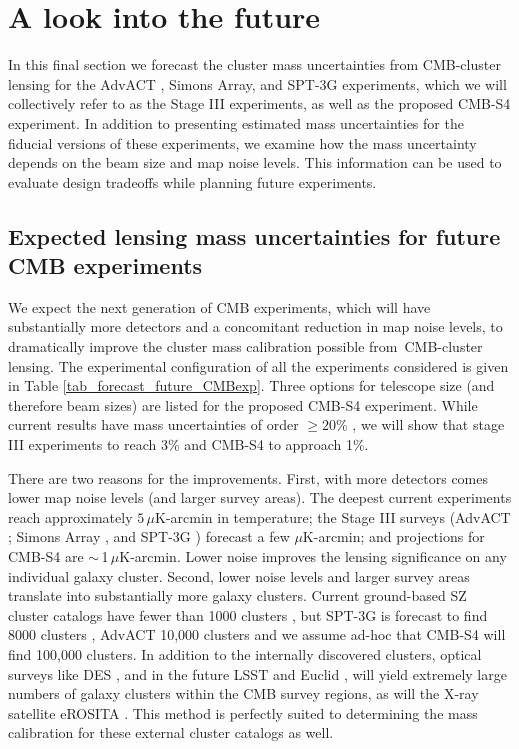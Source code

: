 \section{A look into the future}
\label{sec_forecast}
In this final section we forecast the cluster mass uncertainties from CMB-cluster lensing for the AdvACT , Simons Array, and SPT-3G experiments, which we will collectively refer to as the Stage III experiments, as well as the proposed CMB-S4 experiment.
In addition to presenting estimated mass uncertainties for the fiducial versions of these experiments, we examine how the mass uncertainty depends on  the beam size and map noise levels.
This information can be used to evaluate design tradeoffs while planning future experiments.

\subsection{Expected lensing mass uncertainties for future CMB experiments}
\label{sec_cmbs4}

We expect the next generation of CMB experiments, which will have substantially more detectors and a concomitant reduction in map noise levels, to dramatically improve the cluster mass calibration possible from\
 CMB-cluster lensing.
The experimental configuration of all the experiments considered is given in Table \ref{tab_forecast_future_CMBexp}.
Three options for telescope size (and therefore beam sizes) are listed for the proposed CMB-S4 experiment.
While current results have mass uncertainties of order $\ge 20$\% \citep{baxter15,madhavacheril15,placksz15}, we will show that stage III experiments to reach 3\% and CMB-S4 to approach 1\%.

There are two reasons for the improvements.
First, with more detectors comes lower map noise levels (and larger survey areas).
The deepest current experiments reach approximately $5\,\mu$K-arcmin in temperature; the Stage III surveys  (AdvACT \citep{henderson16};  Simons Array \citep{suzuki15}, and SPT-3G \citep{benson14}) forecast a few $\mu$K-arcmin; and projections for CMB-S4 are $\sim$\,1\,$\mu$K-arcmin.
Lower noise improves the lensing significance on any individual galaxy cluster.
Second, lower noise levels and larger survey areas translate into substantially more galaxy clusters.
Current ground-based SZ cluster catalogs have fewer than 1000 clusters \citep{hasselfield13, bleem15}, but SPT-3G is forecast to find 8000 clusters \citep{benson14}, AdvACT 10,000 clusters \citep{henderson16} and we assume ad-hoc that CMB-S4 will find 100,000 clusters.
In addition to the internally discovered clusters, optical surveys like DES \citep{rykoff16}, and in the future LSST \citep{lsst09} and Euclid \citep{euclid10}, will yield extremely large numbers of galaxy clusters within the CMB survey regions, as will the X-ray satellite eROSITA \citep{erosita12}.
This method is perfectly suited to determining the mass calibration for these external cluster catalogs as well.


